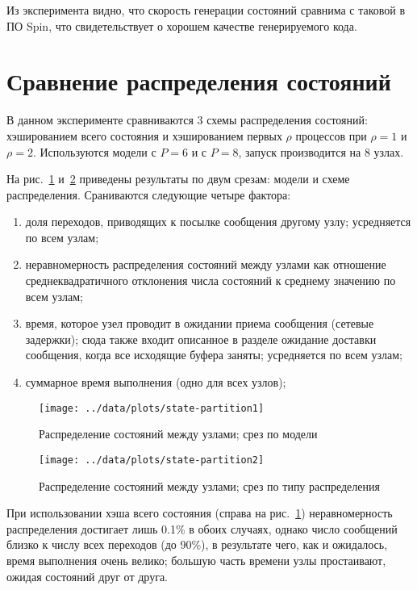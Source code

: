 Из эксперимента видно, что скорость генерации состояний сравнима с таковой в ПО Spin, что
свидетельствует о хорошем качестве генерируемого кода.

\section{Сравнение распределения состояний}
\label{sec:experiment-partition-cmp}

В данном эксперименте сравниваются 3 схемы распределения состояний: хэшированием всего
состояния и хэшированием первых $\rho$ процессов при $\rho = 1$ и $\rho = 2$. Используются
модели  с $P = 6$ и  с $P = 8$, запуск производится на 8 узлах.

На рис.~\ref{fig:state-partition1} и~\ref{fig:state-partition2} приведены результаты по
двум срезам: модели и схеме распределения. Сраниваются следующие четыре фактора:
\begin{enumerate}
\item доля переходов, приводящих к посылке сообщения другому узлу; усредняется по всем
  узлам;
\item неравномерность распределения состояний между узлами как отношение
  среднеквадратичного отклонения числа состояний к среднему значению по всем узлам;
\item время, которое узел проводит в ожидании приема сообщения (сетевые задержки); сюда
  также входит описанное в разделе ожидание доставки сообщения, когда все исходящие буфера
  заняты; усредняется по всем узлам;
\item суммарное время выполнения (одно для всех узлов);
\end{enumerate}

\begin{figure}[p]
  \centering
  \texttt{[image: ../data/plots/state-partition1]}
  \caption{Распределение состояний между узлами; срез по модели}
  \label{fig:state-partition1}
\end{figure}

\begin{figure}[p]
  \centering
  \texttt{[image: ../data/plots/state-partition2]}
  \caption{Распределение состояний между узлами; срез по типу распределения}
  \label{fig:state-partition2}
\end{figure}

При использовании хэша всего состояния (справа на рис.~\ref{fig:state-partition1})
неравномерность распределения достигает лишь 0.1\% в обоих случаях, однако число сообщений
близко к числу всех переходов (до 90\%), в результате чего, как и ожидалось, время
выполнения очень велико; большую часть времени узлы простаивают, ожидая состояний друг от
друга. 

